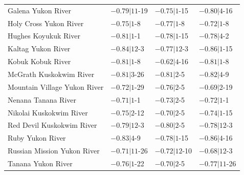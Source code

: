 \documentclass[12pts,draft]{AR_analysis_}
\begin{document}
\begin{table}[h]
\begin{tabular}{llll}
	Galena Yukon River            &  $-0.79|11$-19 &  $-0.75|1$-15 &   $-0.80|4$-16 \\
	Holy Cross Yukon River        &  $-0.75|1$-8 &    $-0.77|1$-8 &    $-0.72|1$-8 \\
	Hughes Koyukuk River          &  $-0.81|1$-1 &    $-0.78|1$-15 &   $-0.78|4$-2 \\
	Kaltag Yukon River            &  $-0.84|12$-3 &   $-0.77|12$-3 &   $-0.86|1$-15 \\
	Kobuk Kobuk River             &  $-0.81|1$-8 &    $-0.62|4$-16 &   $-0.81|1$-8 \\
	McGrath Kuskokwim River       &  $-0.81|3$-26 &   $-0.81|2$-5 &    $-0.82|4$-9 \\
	Mountain Village Yukon River  &  $-0.72|1$-29 &   $-0.76|2$-5 &    $-0.69|2$-19 \\
	Nenana Tanana River           &  $-0.71|1$-1 &    $-0.73|2$-5 &    $-0.72|1$-1 \\
	Nikolai Kuskokwim River       &  $-0.75|2$-12 &   $-0.70|2$-5 &    $-0.74|1$-15 \\
	Red Devil Kuskokwim River     &  $-0.79|12$-3 &   $-0.80|2$-5 &    $-0.78|12$-3 \\
	Ruby Yukon River              &  $-0.83|4$-9 &    $-0.78|1$-15 &   $-0.86|4$-16 \\
	Russian Mission Yukon River   &  $-0.71|11$-26 &  $-0.72|12$-10 &  $-0.68|12$-3 \\
	Tanana Yukon River            &  $-0.76|1$-22 &   $-0.70|2$-5 &    $-0.77|11$-26 \\
    \bottomrule
    \end{tabular}
\end{table}
\end{document}
